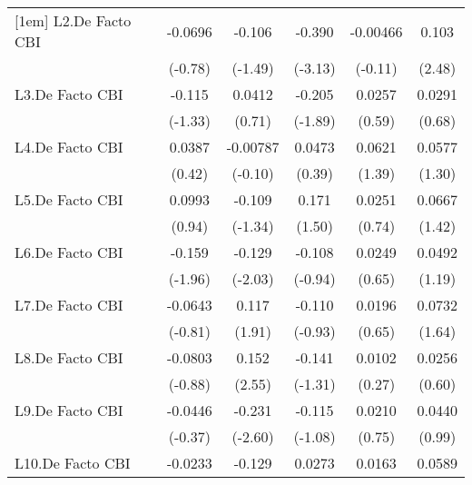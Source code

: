{\begin{longtable}{l*{5}{c}}
[1em]
L2.De Facto CBI &  -0.0696         &   -0.106         &   -0.390\sym{**} & -0.00466         &    0.103\sym{*}  \\
                &  (-0.78)         &  (-1.49)         &  (-3.13)         &  (-0.11)         &   (2.48)         \\
[1em]
L3.De Facto CBI &   -0.115         &   0.0412         &   -0.205         &   0.0257         &   0.0291         \\
                &  (-1.33)         &   (0.71)         &  (-1.89)         &   (0.59)         &   (0.68)         \\
[1em]
L4.De Facto CBI &   0.0387         & -0.00787         &   0.0473         &   0.0621         &   0.0577         \\
                &   (0.42)         &  (-0.10)         &   (0.39)         &   (1.39)         &   (1.30)         \\
[1em]
L5.De Facto CBI &   0.0993         &   -0.109         &    0.171         &   0.0251         &   0.0667         \\
                &   (0.94)         &  (-1.34)         &   (1.50)         &   (0.74)         &   (1.42)         \\
[1em]
L6.De Facto CBI &   -0.159         &   -0.129\sym{*}  &   -0.108         &   0.0249         &   0.0492         \\
                &  (-1.96)         &  (-2.03)         &  (-0.94)         &   (0.65)         &   (1.19)         \\
[1em]
L7.De Facto CBI &  -0.0643         &    0.117         &   -0.110         &   0.0196         &   0.0732         \\
                &  (-0.81)         &   (1.91)         &  (-0.93)         &   (0.65)         &   (1.64)         \\
[1em]
L8.De Facto CBI &  -0.0803         &    0.152\sym{*}  &   -0.141         &   0.0102         &   0.0256         \\
                &  (-0.88)         &   (2.55)         &  (-1.31)         &   (0.27)         &   (0.60)         \\
[1em]
L9.De Facto CBI &  -0.0446         &   -0.231\sym{*}  &   -0.115         &   0.0210         &   0.0440         \\
                &  (-0.37)         &  (-2.60)         &  (-1.08)         &   (0.75)         &   (0.99)         \\
[1em]
L10.De Facto CBI&  -0.0233         &   -0.129         &   0.0273         &   0.0163         &   0.0589         \\

\end{longtable}}
